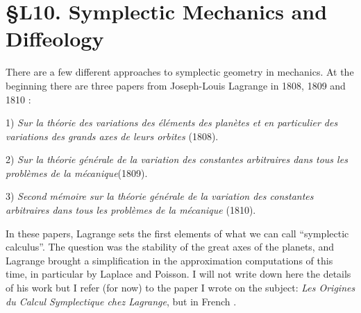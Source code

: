 
\chapter*{\S L10. Symplectic Mechanics and Diffeology}
\setcounter{footnote}{0}

\begin{abstract}
  I give,
  in this lecture,
  a short survey on symplectic mechanics.
  The basic foundations in the work of Lagrange at the end of the 18th century and the beginning of the 19th,
  and what it became in the middle of the 20th century with what it is called now:
  \emph{symplectic mechanics}.
  We will discuss also how to extend these constructions to Diffeology,
  the main concepts.
\end{abstract}


There are a few different approaches to symplectic geometry in mechanics.
At the beginning there are three papers from Joseph-Louis Lagrange in 1808, 1809 and 1810 \cite{Lag08,Lag09,Lag10}:

1) {\em Sur la th\'eorie des variations des \'el\'ements des plan\`etes et en particulier des variations des grands axes de leurs orbites} (1808).

2) {\em Sur la th\'eorie g\'en\'erale de la variation des constantes arbitraires dans tous les probl\`emes de la m\'ecanique}(1809).

3) {\em Second m\'emoire sur la th\'eorie g\'en\'erale de la variation des constantes arbitraires dans tous les probl\`emes de la m\'ecanique} (1810).

In these papers,
Lagrange sets the first elements of what we can call ``symplectic calculus''.
The question was the stability of the great axes of the planets,
and Lagrange brought a simplification in the approximation computations of this time,
in particular by Laplace and Poisson.
I will not write down here the details of his work but I refer (for now) to the paper I wrote on the subject:
{\em Les Origines du Calcul Symplectique chez Lagrange},
but in French \cite{PIZ98}.

